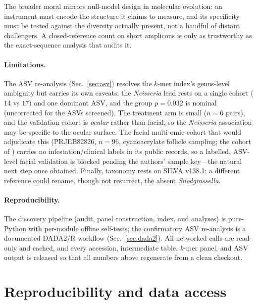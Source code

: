 \documentclass[11pt]{article}
\begin{document}
The broader moral mirrors null-model design in molecular evolution: an instrument
must encode the structure it claims to measure, and its specificity must be
tested against the diversity actually present, not a handful of distant
challengers. A closed-reference count on short amplicons is only as trustworthy as
the exact-sequence analysis that audits it.

\paragraph{Limitations.} The ASV re-analysis (Sec.~\ref{sec:asv}) resolves the
$k$-mer index's genus-level ambiguity but carries its own caveats: the
\textit{Neisseria} lead rests on a single cohort ($14$ vs $17$) and one dominant
ASV, and the group $p=0.032$ is nominal (uncorrected for the ASVs screened). The
treatment arm is small ($n=6$ pairs), and the validation cohort is \emph{ocular}
rather than facial, so the \textit{Neisseria} association may be specific to the
ocular surface. The facial multi-omic cohort that would adjudicate this
(PRJEB82826, $n=96$, cyanoacrylate follicle sampling; the cohort of
\citet{olah2025}) carries no infestation/clinical labels in its public records,
so a labelled, ASV-level facial validation is blocked pending the authors' sample
key---the natural next step once obtained. Finally, taxonomy rests on SILVA
v138.1; a different reference could rename, though not resurrect, the absent
\textit{Snodgrassella}.

\paragraph{Reproducibility.} The discovery pipeline (audit, panel construction,
index, and analyses) is pure-Python with per-module offline self-tests; the
confirmatory ASV re-analysis is a documented DADA2/R workflow (Sec.~\ref{sec:dada2}).
All networked calls are read-only and cached, and every accession, intermediate
table, $k$-mer panel, and ASV output is released so that all numbers above
regenerate from a clean checkout.

\appendix

\section{Reproducibility and data access}\label{app:repro}
\end{document}
